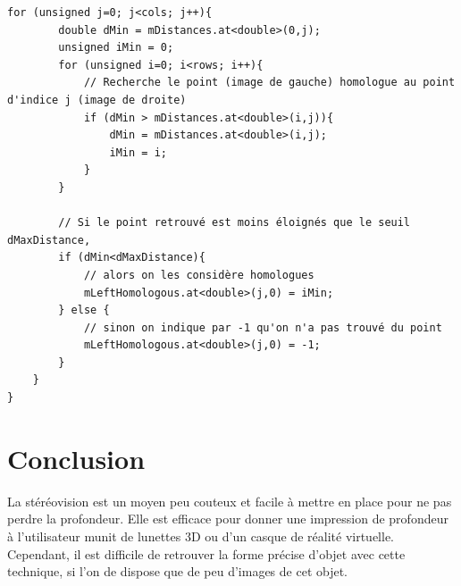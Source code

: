 \documentclass[a4paper,11pt]{article}
\begin{document}
\begin{lstlisting}[caption=Fontion de recherche de points homologues]
    for (unsigned j=0; j<cols; j++){
        double dMin = mDistances.at<double>(0,j);
        unsigned iMin = 0;
        for (unsigned i=0; i<rows; i++){
            // Recherche le point (image de gauche) homologue au point d'indice j (image de droite)
            if (dMin > mDistances.at<double>(i,j)){
                dMin = mDistances.at<double>(i,j);
                iMin = i;
            }
        }

        // Si le point retrouvé est moins éloignés que le seuil dMaxDistance,
        if (dMin<dMaxDistance){
            // alors on les considère homologues
            mLeftHomologous.at<double>(j,0) = iMin;
        } else {
            // sinon on indique par -1 qu'on n'a pas trouvé du point
            mLeftHomologous.at<double>(j,0) = -1;
        }
    }
}
\end{lstlisting}

\section{Conclusion}

La stéréovision est un moyen peu couteux et facile à mettre en place pour ne pas perdre la 
profondeur. Elle est efficace pour donner une impression de profondeur à l'utilisateur munit 
de lunettes 3D ou d'un casque de réalité virtuelle. Cependant, il est difficile de retrouver la
forme précise d'objet avec cette technique, si l'on de dispose que de peu d'images de cet 
objet.
\end{document}
